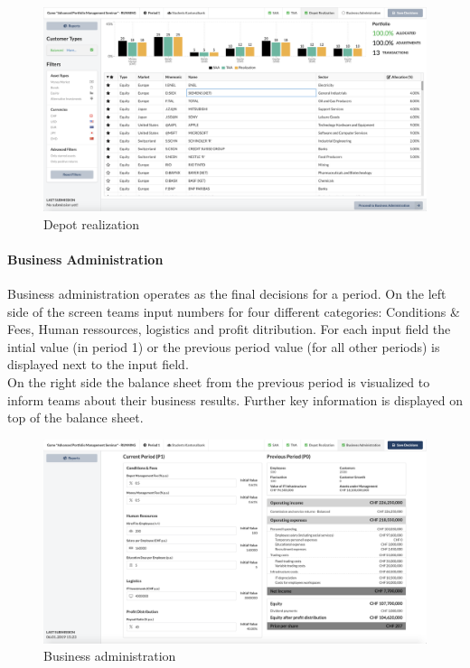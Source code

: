 \begin{figure}[h!]
  \centering
  \includegraphics[scale=0.2]{img/application-overview/teams/05_depot_realization.png}
  \caption{Depot realization}
\end{figure}

\paragraph{Business Administration}
Business administration operates as the final decisions for a period. On the left side of the screen teams input numbers for four different categories: Conditions \& Fees, Human ressources, logistics and profit ditribution. For each input field the intial value (in period 1) or the previous period value (for all other periods) is displayed next to the input field.\\

On the right side the balance sheet from the previous period is visualized to inform teams about their business results. Further key information is displayed on top of the balance sheet.
\begin{figure}[h!]
  \centering
  \includegraphics[scale=0.2]{img/application-overview/teams/06_business.png}
  \caption{Business administration}
\end{figure}


